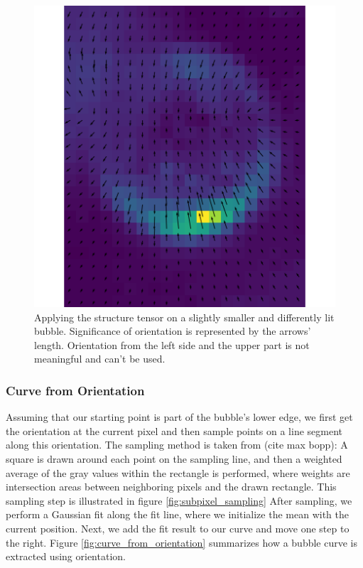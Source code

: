 					
			\begin{figure}
				\includegraphics[scale=0.5]{images/struct_tensor_result_2.png}
				\caption{Applying the structure tensor on a slightly smaller and differently lit bubble. Significance of orientation is represented by the arrows' length. Orientation from the left side and the upper part is not meaningful and can't be used.}
				\label{fig:struct_tensor_result_2}
			\end{figure}
	
	
	
	
	
	
	
			\subsubsection{Curve from Orientation}
				Assuming that our starting point is part of the bubble's lower edge, we first get the orientation at the current pixel and then sample points on a line segment along this orientation. The sampling method is taken from (cite max bopp): A square is drawn around each point on the sampling line, and then a weighted average of the gray values within the rectangle is performed, where weights are intersection areas between neighboring pixels and the drawn rectangle. This sampling step is illustrated in figure \ref{fig:subpixel_sampling}
				 After sampling, we perform a Gaussian fit along the fit line, where we initialize the mean with the current position. Next, we add the fit result to our curve and move one step to the right. Figure \ref{fig:curve_from_orientation} summarizes how a bubble curve is extracted using orientation. 
				 
